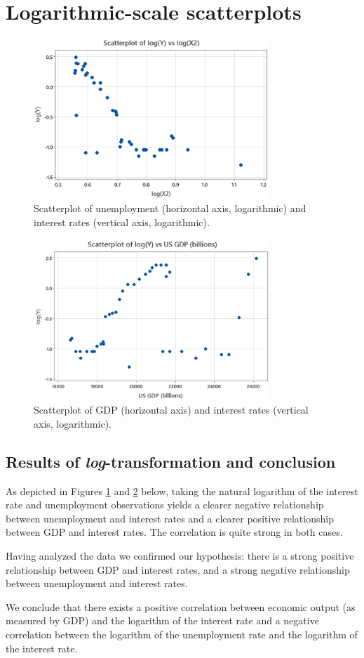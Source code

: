 \documentclass[12pt]{article}
\begin{document}
\section{Logarithmic-scale scatterplots}
\begin{figure}
\begin{center}
\includegraphics[width=3.5in]{images/log-unemployment-log-scatterplot.png}
\end{center}
\caption{Scatterplot of unemployment (horizontal axis, logarithmic) and interest rates (vertical axis, logarithmic).\label{fig:logunemploymentlogscatterplot}}
\end{figure}
\begin{figure}[ht]
\begin{center}
\includegraphics[width=3.5in]{images/gdp-log-scatterplot.png}
\end{center}
\caption{Scatterplot of GDP (horizontal axis) and interest rates (vertical axis, logarithmic).\label{fig:gdplogscatterplot}}
\end{figure}
\subsection{Results of \emph{log}-transformation and conclusion}
As depicted in Figures \ref{fig:logunemploymentlogscatterplot} and \ref{fig:gdplogscatterplot} below, taking the natural logarithm of the interest rate and unemployment observations yields a clearer negative relationship between unemployment and interest rates and a clearer positive relationship between GDP and interest rates. The correlation is quite strong in both cases.

Having analyzed the data we confirmed our hypothesis: there is a strong positive relationship between GDP and interest rates, and a strong negative relationship between unemployment and interest rates.

We conclude that there exists a positive correlation between economic output (as measured by GDP) and the logarithm of the interest rate and a negative correlation between the logarithm of the unemployment rate and the logarithm of the interest rate. 
\end{document}
